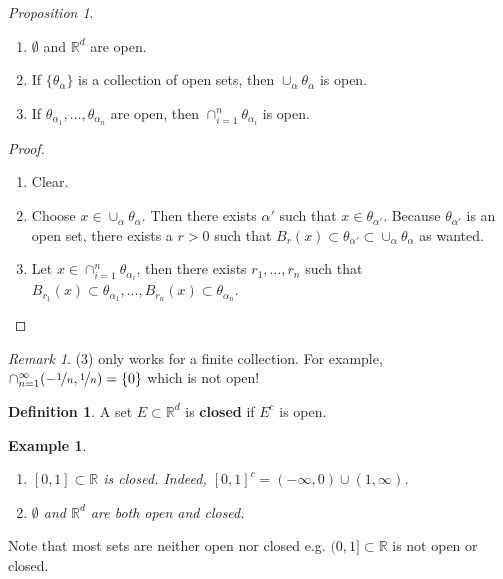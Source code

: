\documentclass[a4paper, 11pt]{book}
\newtheorem*{example}{Example}
\theoremstyle{definition}
\newtheorem{definition}{Definition}[section]
\theoremstyle{remark}
\newtheorem*{remark}{Remark}
\newtheorem{prop}{Proposition}
\begin{document}
    \begin{prop}
        \begin{enumerate}
            \item $\emptyset$ and $\mathbb{R}^d$ are open.
            \item If $\{\theta_{\alpha}\}$ is a collection of open sets, then $\cup_{\alpha}\theta_{\alpha}$ is open.
            \item If $\theta_{\alpha_1},\hdots,\theta_{\alpha_n}$ are open, then $\cap_{i=1}^n \theta_{\alpha_i}$ is open.
        \end{enumerate}
    \end{prop}
    \begin{proof}
        \begin{enumerate}
            \item Clear.
            \item Choose $x\in\cup_{\alpha}\theta_{\alpha}$. Then there exists $\alpha'$ such that $x\in \theta_{\alpha'}$. Because
                $\theta_{\alpha'}$ is an open set, there exists a $r>0$ such that 
                $B_r(x)\subset\theta_{\alpha'}\subset\cup_{\alpha}\theta_{\alpha}$ as wanted.
            \item Let $x\in\cap_{i=1}^n \theta_{\alpha_i}$, then there exists $r_1,\hdots,r_n$ such that 
                $B_{r_1}(x)\subset\theta_{\alpha_1},\hdots,B_{r_n}(x)\subset\theta_{\alpha_n}$.
        \end{enumerate}
    \end{proof}

    \begin{remark}
        (3) only works for a finite collection. For example, $\cap_{n=1}^{\infty} (-\nicefrac{1}{n},\nicefrac{1}{n}) = \{0\}$ which
        is not open!
    \end{remark}

    \begin{definition}
        A set $E\subset \mathbb{R}^d$ is \textbf{closed} if $E^c$ is open.
    \end{definition}

    \begin{example}
        \begin{enumerate}
            \item $[0,1]\subset\mathbb{R}$ is closed. Indeed, $[0,1]^c = (-\infty, 0) \cup (1,\infty)$.
            \item $\emptyset$ and $\mathbb{R}^d$ are both open and closed.
        \end{enumerate}
    \end{example}

    Note that most sets are neither open nor closed e.g. $(0,1]\subset \mathbb{R}$ is not open or closed.
\end{document}
